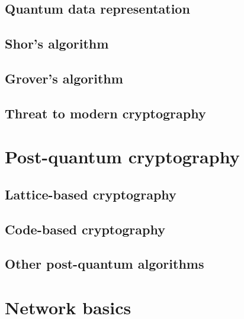 \section{Quantum data representation}
\label{sec:quantum_data_repr}


\section{Shor's algorithm}
\label{sec:shors_algorithm}


\section{Grover's algorithm}
\label{sec:grovers_alg}


\section{Threat to modern cryptography}
\label{sec:threat_to_modern}


\chapter{Post-quantum cryptography}
\label{ch:pq-crypto}


\section{Lattice-based cryptography}
\label{sec:lattice-based_crypto}


\section{Code-based cryptography}
\label{sec:code-based_crypto}


\section{Other post-quantum algorithms}
\label{sec:other_pq_alg}


\chapter{Network basics}
\label{ch:network_baics}


